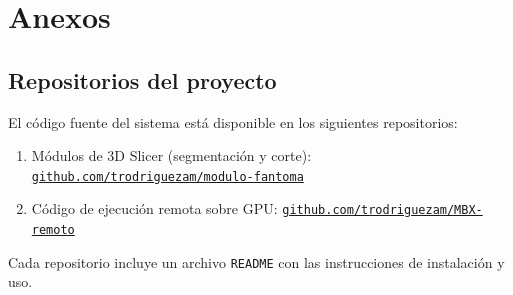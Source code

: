 \chapter{Anexos}
\label{ch:anexos}

\section{Repositorios del proyecto}
\label{ax:repositorios}

El código fuente del sistema está disponible en los siguientes repositorios:

\begin{enumerate}
  \item Módulos de 3D Slicer (segmentación y corte): \href{https://github.com/trodriguezam/modulo-fantoma}{\texttt{github.com/trodriguezam/modulo-fantoma}}
  \item Código de ejecución remota sobre GPU: \href{https://github.com/trodriguezam/MBX-remoto}{\texttt{github.com/trodriguezam/MBX-remoto}}
\end{enumerate}

Cada repositorio incluye un archivo \texttt{README} con las instrucciones de instalación y uso.
